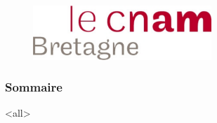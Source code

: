 \documentclass[ignorenonframetext, 8pt, allowframebreaks]{beamer}
\title[\ushorttitle]{\utitle}
\author[\uauthortwitter]{ \uauthor \\ \medskip {\small \url{\umaila} \and \url{\umailb}\\ {\small \url{\usitea}}}}
\institute[\uinstituteshort]{\uinstitute \\ \uchaire}
\date[\uversion]{Date de publication\\ \today}
\begin{document}
\begin{frame}[plain]

 					\begin{figure}
  					 \centering
   						 \includegraphics[width=0.6\textwidth]{../Tex/Pictures/cnambretagne.pdf}\\
				  \end{figure}

				  				\titlepage
\end{frame}
\begin{frame}
 \frametitle{Sommaire}
 \tableofcontents
 \end{frame}
 
\mode<all>{\ubody}


\end{document}
